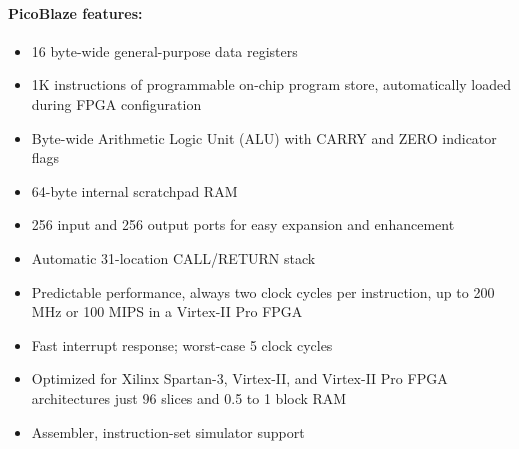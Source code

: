     \paragraph{PicoBlaze features:}
        \begin{itemize}
            \item 16 byte-wide general-purpose data registers
            \item 1K instructions of programmable on-chip program store, automatically loaded during FPGA configuration
            \item Byte-wide Arithmetic Logic Unit (ALU) with CARRY and ZERO indicator flags
            \item 64-byte internal scratchpad RAM
            \item 256 input and 256 output ports for easy expansion and enhancement
            \item Automatic 31-location CALL/RETURN stack
            \item Predictable performance, always two clock cycles per instruction, up to 200 MHz or 100 MIPS in a Virtex-II Pro FPGA
            \item Fast interrupt response; worst-case 5 clock cycles
            \item Optimized for Xilinx Spartan-3, Virtex-II, and Virtex-II Pro FPGA architectures just 96 slices and 0.5 to 1 block RAM
            \item Assembler, instruction-set simulator support
        \end{itemize}
